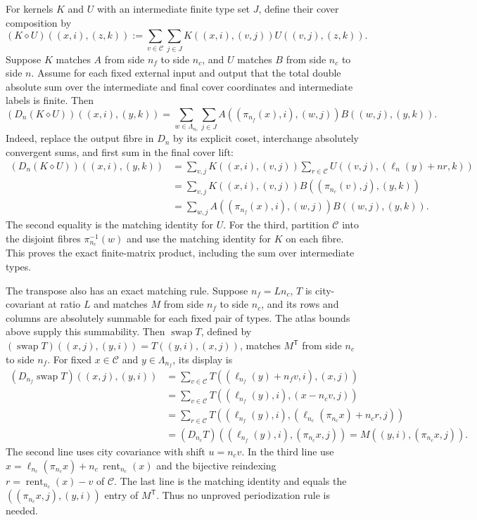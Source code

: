 For kernels $K$ and $U$ with an intermediate finite type set $J$, define their
cover composition by
\[
 (K\diamond U)((x,i),(z,k))
 :=\sum_{v\in\mathcal C}\sum_{j\in J}
       K((x,i),(v,j))U((v,j),(z,k)).
\]
Suppose $K$ matches $A$ from side $n_f$ to side $n_c$, and $U$ matches $B$
from side $n_c$ to side $n$. Assume for each fixed external input and output
that the total double absolute sum over the intermediate and final cover
coordinates and intermediate labels is finite. Then
\begin{equation}
 (D_n(K\diamond U))((x,i),(y,k))
 =\sum_{w\in\Lambda_{n_c}}\sum_{j\in J}
   A((\pi_{n_f}(x),i),(w,j))B((w,j),(y,k)).
 \label{eq:ex-lattice-flat-step-composition}
\end{equation}
Indeed, replace the output fibre in $D_n$ by its explicit coset, interchange
absolutely convergent sums, and first sum in the final cover lift:
\[
\begin{split}
 (D_n(K\diamond U))((x,i),(y,k))
 &=\sum_{v,j}K((x,i),(v,j))
       \sum_{r\in\mathcal C}U((v,j),(\ell_n(y)+nr,k))\\
 &=\sum_{v,j}K((x,i),(v,j))B((\pi_{n_c}(v),j),(y,k))\\
 &=\sum_{w,j}A((\pi_{n_f}(x),i),(w,j))B((w,j),(y,k)).
\end{split}
\]
The second equality is the matching identity for $U$. For the third, partition
$\mathcal C$ into the disjoint fibres $\pi_{n_c}^{-1}(w)$ and use the matching
identity for $K$ on each fibre. This proves the exact finite-matrix product,
including the sum over intermediate types.

The transpose also has an exact matching rule. Suppose $n_f=Ln_c$, $T$ is
city-covariant at ratio $L$ and matches $M$ from side $n_f$ to side $n_c$,
and its rows and columns are absolutely summable for each fixed pair of types.
The atlas bounds above supply this summability. Then
$\operatorname{swap}T$, defined by
$(\operatorname{swap}T)((x,j),(y,i))=T((y,i),(x,j))$, matches $M^{\mathsf T}$
from side $n_c$ to side $n_f$. For fixed $x\in\mathcal C$ and $y\in\Lambda_{n_f}$, its display is
\[
\begin{split}
 (D_{n_f}\operatorname{swap}T)((x,j),(y,i))
 &=\sum_{v\in\mathcal C}T((\ell_{n_f}(y)+n_fv,i),(x,j))\\
 &=\sum_{v\in\mathcal C}T((\ell_{n_f}(y),i),(x-n_c v,j))\\
 &=\sum_{r\in\mathcal C}T((\ell_{n_f}(y),i),
                    (\ell_{n_c}(\pi_{n_c} x)+n_c r,j))\\
 &=(D_{n_c}T)((\ell_{n_f}(y),i),(\pi_{n_c} x,j))
 =M((y,i),(\pi_{n_c} x,j)).
\end{split}
\]
The second line uses city covariance with shift $u=n_c v$. In the third line use
$x=\ell_{n_c}(\pi_{n_c} x)+n_c\,\operatorname{rent}_{n_c}(x)$ and the bijective
reindexing $r=\operatorname{rent}_{n_c}(x)-v$ of $\mathcal C$. The last line
is the matching identity and equals the $( (\pi_{n_c} x,j),(y,i))$ entry of
$M^{\mathsf T}$. Thus no unproved periodization rule is needed.

